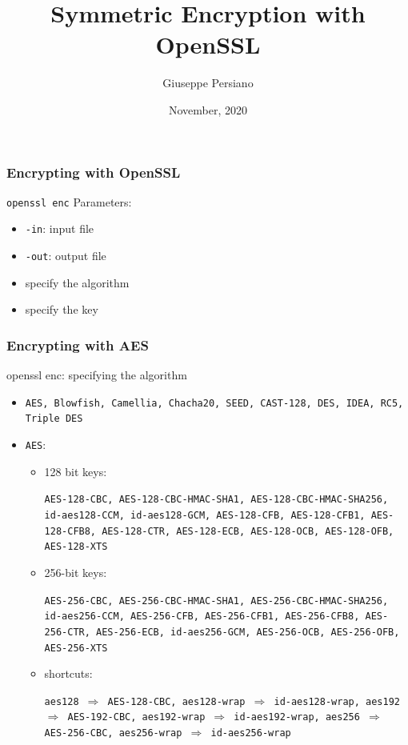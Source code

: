 \documentclass[]{beamer}
\title[]{Symmetric Encryption with OpenSSL}
\author{Giuseppe Persiano}
\institute[UNISA]{%
Universit\`a di Salerno\\ \qquad \\
}
\date[November 2020]{November, 2020}
\begin{document}
{
\begin{frame}
  \titlepage
\end{frame}
\begin{frame}
\frametitle{Encrypting with OpenSSL}
\begin{block}{\tt openssl enc}
Parameters:
\begin{itemize}
\item {\tt -in}: input file
\item {\tt -out}: output file
\item specify the algorithm
\item specify the key
\end{itemize}
\end{block}
\end{frame}

\begin{frame}
\frametitle{Encrypting with AES}
\begin{block}{openssl enc: specifying the algorithm}
\begin{itemize}
\item{\tt AES, Blowfish, Camellia, Chacha20, SEED, CAST-128, DES, IDEA, RC5, Triple DES}

\item {\tt AES}:
    \begin{itemize}
        \item {\color{red} 128 bit keys:}

        {\tt AES-128-CBC, AES-128-CBC-HMAC-SHA1, 
             AES-128-CBC-HMAC-SHA256, 
             id-aes128-CCM, 
             id-aes128-GCM, 
             AES-128-CFB, 
             AES-128-CFB1, 
             AES-128-CFB8, 
             AES-128-CTR, 
             AES-128-ECB, 
             AES-128-OCB, 
             AES-128-OFB, 
             AES-128-XTS}

        \item {\color{red} 256-bit keys:}

        {\tt AES-256-CBC, AES-256-CBC-HMAC-SHA1, 
             AES-256-CBC-HMAC-SHA256, 
             id-aes256-CCM, 
             AES-256-CFB, 
             AES-256-CFB1, 
             AES-256-CFB8, 
             AES-256-CTR, 
             AES-256-ECB, 
             id-aes256-GCM, 
             AES-256-OCB, 
             AES-256-OFB, 
             AES-256-XTS}

\item {\color{red} shortcuts:}

        {\tt aes128 $\Rightarrow$ AES-128-CBC, 
             aes128-wrap $\Rightarrow$ id-aes128-wrap, 
             aes192 $\Rightarrow$ AES-192-CBC, 
             aes192-wrap $\Rightarrow$ id-aes192-wrap, 
             aes256 $\Rightarrow$ AES-256-CBC, 
             aes256-wrap $\Rightarrow$ id-aes256-wrap
        }
\end{itemize}
\end{itemize}
\end{block}
\end{frame}

}
\end{document}
